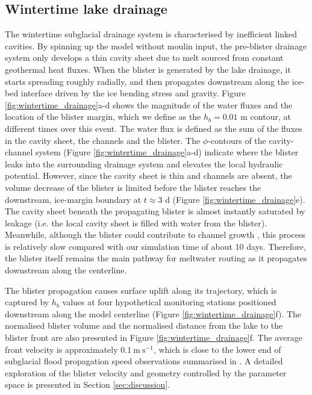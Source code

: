 \documentclass[draft]{agujournal2019}
\newcommand{\secref}[1]{Section \ref{#1}}
\newcommand{\figref}[1]{Figure \ref{#1}}
\begin{document}
\subsection{Wintertime lake drainage}\label{sec:wintertime}
The wintertime subglacial drainage system is characterised by inefficient linked cavities. By spinning up the model without moulin input, the pre-blister drainage system only develops a thin cavity sheet due to melt sourced from constant geothermal heat fluxes. When the blister is generated by the lake drainage, it starts spreading roughly radially, and then propagates downstream along the ice-bed interface driven by the ice bending stress and gravity. \figref{fig:wintertime_drainage}a-d shows the magnitude of the water fluxes and the location of the blister margin, which we define as the $h_b=0.01$ m contour, at different times over this event. The water flux is defined as the sum of the fluxes in the cavity sheet, the channels and the blister. The $\phi$-contours of the cavity-channel system (\figref{fig:wintertime_drainage}a-d) indicate where the blister leaks into the surrounding drainage system and elevates the local hydraulic potential. However, since the cavity sheet is thin and channels are absent, the volume decrease of the blister is limited before the blister reaches the downstream, ice-margin boundary at $t\approx3$ d (\figref{fig:wintertime_drainage}e). The cavity sheet beneath the propagating blister is almost instantly saturated by leakage (i.e. the local cavity sheet is filled with water from the blister). Meanwhile, although the blister could contribute to channel growth \cite{dow2015Modeling}, this process is relatively slow compared with our simulation time of about 10 days. Therefore, the blister itself remains the main pathway for meltwater routing as it propagates downstream along the centerline.

The blister propagation causes surface uplift along its trajectory, which is captured by $h_b$ values at four hypothetical monitoring stations positioned downstream along the model centerline (\figref{fig:wintertime_drainage}f). The normalised blister volume and the normalised distance from the lake to the blister front are also presented in \figref{fig:wintertime_drainage}f. The average front velocity is approximately $0.1~\text{m}~\text{s}^{-1}$, which is close to the lower end of subglacial flood propagation speed observations summarised in . A detailed exploration of the blister velocity and geometry controlled by the parameter space is presented in \secref{sec:discussion}.
\end{document}
